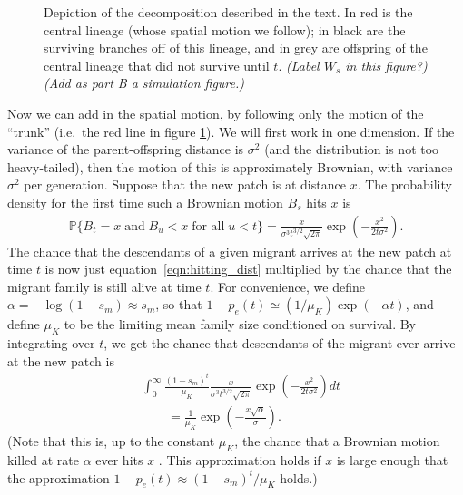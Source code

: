 \documentclass{article}
\renewcommand{\P}{\mathbb{P}}
\newcommand{\deq}{\stackrel{\scriptscriptstyle{d}}{=}}
\newcommand{\plr}[1]{{\it\color{blue}(#1)}}
\begin{document}
\begin{figure}[ht!!]
  \begin{center}
  
  \end{center}
\caption{Depiction of the decomposition described in the text.
In red is the central lineage (whose spatial motion we follow);
in black are the surviving branches off of this lineage, 
and in grey are offspring of the central lineage that did not survive until $t$.
\plr{Label $W_s$ in this figure?}
\plr{Add as part B a simulation figure.}
\label{fig:branching_decomp}
}
\end{figure}

Now we can add in the spatial motion, by following only the motion of the ``trunk''
(i.e.\ the red line in figure \ref{fig:branching_decomp}).
We will first work in one dimension.
If the variance of the parent-offspring distance is $\sigma^2$ (and the distribution is not too heavy-tailed),
then the motion of this is approximately Brownian, with variance $\sigma^2$ per generation.
Suppose that the new patch is at distance $x$.
The probability density for the first time such a Brownian motion $B_s$ hits $x$ is
\citep[XXX]{feller}
\begin{align} \label{eqn:hitting_dist}
  \P\{ B_t=x \;\mbox{and} \; B_u<x \;\mbox{for all}\; u<t\} =  \frac{x}{\sigma^3 t^{3/2}\sqrt{2\pi}} \exp\left(-\frac{x^2}{2t\sigma^2}\right) .
\end{align}
The chance that the descendants of a given migrant arrives at the new patch at time $t$
is now just equation~\eqref{eqn:hitting_dist} multiplied by the chance that 
the migrant family is still alive at time $t$.
For convenience, we define $\alpha = - \log(1-s_m) \approx s_m$,
so that $1-p_e(t) \simeq (1/\mu_K) \exp(-\alpha t)$,
and define $\mu_K$ to be the limiting mean family size conditioned on survival.
By integrating over $t$, we get the chance that descendants of the migrant ever arrive at the new patch is
\begin{align} 
  & \int_0^\infty \frac{(1-s_m)^t}{\mu_K} \frac{x}{\sigma^3 t^{3/2}\sqrt{2\pi}} \exp\left(-\frac{x^2}{2t\sigma^2}\right)  dt \\
  & \qquad = \frac{1}{\mu_K} \exp\left( - \frac{ x \sqrt{\alpha}}{\sigma} \right) .\label{eqn:estab_prob}
\end{align}
(Note that this is, up to the constant $\mu_K$, the chance that a Brownian motion killed at rate $\alpha$
ever hits $x$ \citep{feller}.
This approximation holds if $x$ is large enough that the approximation $1-p_e(t) \approx (1-s_m)^t/\mu_K$ holds.)
\end{document}
